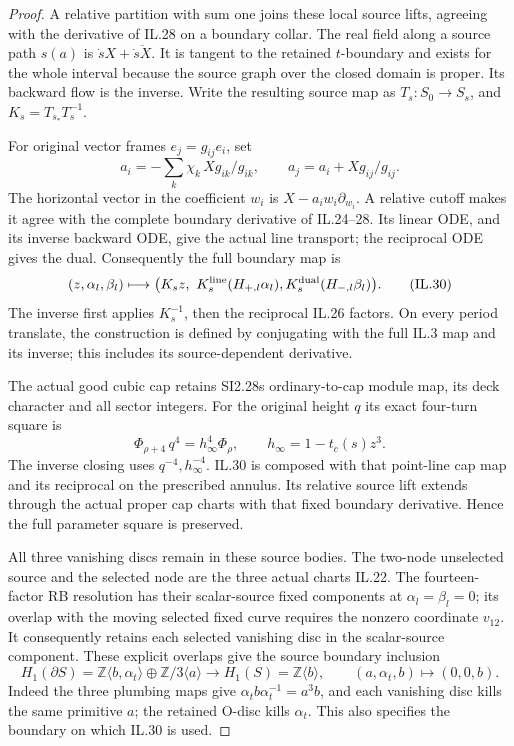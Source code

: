 \begin{proof}
A relative partition with sum one joins these local source
lifts, agreeing with the derivative of IL.28 on a boundary
collar. The real field along a source path \(s(a)\) is
\(\dot s X+\overline{\dot s X}\). It is tangent to the
retained \(t\)-boundary and exists for the whole interval
because the source graph over the closed domain is proper.
Its backward flow is the inverse. Write the resulting source
map as \(T_s:S_0\to S_s\), and \(K_s=T_{s_*}T_s^{-1}\).

For original vector frames \(e_j=g_{ij}e_i\), set
\[
 a_i=-\sum_k\chi_k\,Xg_{ik}/g_{ik},\qquad
 a_j=a_i+Xg_{ij}/g_{ij}.
 \tag{IL.29}
\]
The horizontal vector in the coefficient \(w_i\) is
\(X-a_iw_i\partial_{w_i}\). A relative cutoff makes it agree
with the complete boundary derivative of IL.24--28. Its
linear ODE, and its inverse backward ODE, give the actual
line transport; the reciprocal ODE gives the dual.
Consequently the full boundary map is
\[
 (z,\alpha_l,\beta_l)\longmapsto
 \bigl(K_sz,\ K_s^{\rm line}(H_{+,l}\alpha_l),
                   K_s^{\rm dual}(H_{-,l}\beta_l)\bigr).
 \tag{IL.30}
\]
The inverse first applies \(K_s^{-1}\), then the reciprocal
IL.26 factors. On every period translate, the construction is
defined by conjugating with the full IL.3 map and its inverse;
this includes its source-dependent derivative.

The actual good cubic cap retains SI2.28\textquotesingle s ordinary-to-cap
module map, its deck character and all sector integers.
For the original height \(q\) its exact four-turn square is
\[
           \Phi_{\rho+4}\,q^4=h_\infty^4\Phi_\rho,
                 \qquad h_\infty=1-t_c(s)z^3.
 \tag{IL.31}
\]
The inverse closing uses \(q^{-4},h_\infty^{-4}\).
IL.30 is composed with that point-line cap map and its
reciprocal on the prescribed annulus. Its relative source
lift extends through the actual proper cap charts with that
fixed boundary derivative. Hence the full parameter square
is preserved.

All three vanishing discs remain in these source bodies.
The two-node unselected source and the selected node are the
three actual charts IL.22. The fourteen-factor RB resolution
has their scalar-source fixed components at
\(\alpha_l=\beta_l=0\); its overlap with the moving selected
fixed curve requires the nonzero coordinate \(v_{12}\).
It consequently retains each selected vanishing disc in the
scalar-source component. These explicit overlaps give the
source boundary inclusion
\[
 H_1(\partial S)=\mathbb Z\langle b,\alpha_t\rangle
                  \oplus\mathbb Z/3\langle a\rangle
 \longrightarrow H_1(S)=\mathbb Z\langle b\rangle,\qquad
                  (a,\alpha_t,b)\mapsto(0,0,b).
 \tag{IL.32}
\]
Indeed the three plumbing maps give
\(\alpha_t b\alpha_t^{-1}=a^3b\), and each vanishing
disc kills the same primitive \(a\); the retained O-disc
kills \(\alpha_t\). This also specifies the boundary on
which IL.30 is used.


\end{proof}
